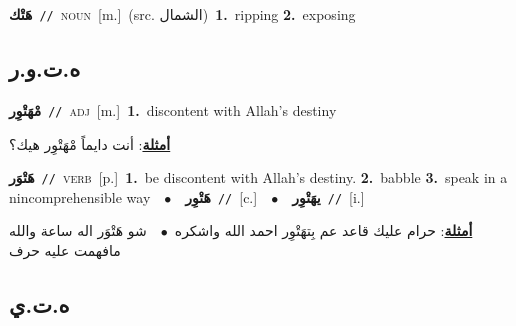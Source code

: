 \documentclass[10pt,a4paper,twoside]{article} %
\begin{document}
\begin{multicols}{2}
{\setlength\topsep{0pt}\textbf{\foreignlanguage{arabic}{هَتْك}}\ {\color{gray}\texttt{//}\color{black}}\ \textsc{noun}\ [m.]\ (src. \color{gray}\foreignlanguage{arabic}{الشمال}\color{black})\ \textbf{1.}~ripping  \textbf{2.}~exposing\ } \vspace{2mm}

\vspace{-3mm}
\subsection*{\color{blue}\foreignlanguage{arabic}{ه.ت.و.ر}\color{blue}{}} 

{\setlength\topsep{0pt}\textbf{\foreignlanguage{arabic}{مْهَتْوِر}}\ {\color{gray}\texttt{//}\color{black}}\ \textsc{adj}\ [m.]\ \textbf{1.}~discontent with Allah's destiny\  \begin{flushright}\color{gray}\foreignlanguage{arabic}{\textbf{\underline{\foreignlanguage{arabic}{أمثلة}}}: أنت دايماً مْهَتْوِر هيك؟}\end{flushright}\color{black}} \vspace{2mm}

{\setlength\topsep{0pt}\textbf{\foreignlanguage{arabic}{هَتْوَر}}\ {\color{gray}\texttt{//}\color{black}}\ \textsc{verb}\ [p.]\ \textbf{1.}~be discontent with Allah's destiny.  \textbf{2.}~babble  \textbf{3.}~speak in a nincomprehensible way\ \ $\bullet$\ \ \setlength\topsep{0pt}\textbf{\foreignlanguage{arabic}{هَتْوِر}}\ {\color{gray}\texttt{//}\color{black}}\ [c.]\ \ $\bullet$\ \ \setlength\topsep{0pt}\textbf{\foreignlanguage{arabic}{يهَتْوِر}}\ {\color{gray}\texttt{//}\color{black}}\ [i.]\  \begin{flushright}\color{gray}\foreignlanguage{arabic}{\textbf{\underline{\foreignlanguage{arabic}{أمثلة}}}: حرام عليك قاعد عم بِتهَتْوِر احمد الله واشكره\ $\bullet$\ \  شو هَتْوَر اله ساعة والله مافهمت عليه حرف}\end{flushright}\color{black}} \vspace{2mm}

\vspace{-3mm}
\subsection*{\color{blue}\foreignlanguage{arabic}{ه.ت.ي}\color{blue}{}} 


\end{multicols}
\end{document}
